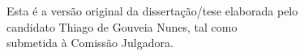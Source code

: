\documentclass[11pt,twoside,a4paper]{book}
\begin{document}
    \vskip 2cm

    \begin{flushright}
  Esta é a versão original da dissertação/tese elaborada pelo\\
  candidato Thiago de Gouveia Nunes, tal como \\
  submetida à Comissão Julgadora.
    \end{flushright}

\pagebreak


%
%
%
%






\end{document}

